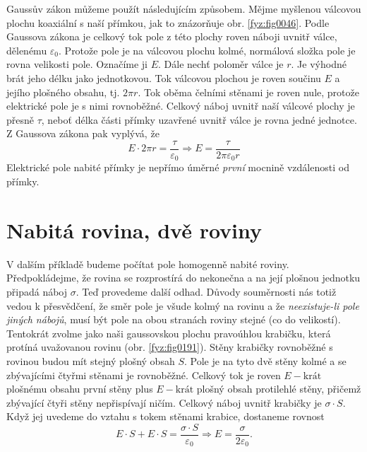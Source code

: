 
  Gaussův zákon můžeme použít následujícím způsobem. Mějme myšlenou válcovou plochu koaxiální s naší
  přímkou, jak to znázorňuje obr. \ref{fyz:fig0046}. Podle Gaussova zákona je celkový tok pole z této
  plochy roven náboji uvnitř válce, dělenému \(\varepsilon_0\). Protože pole je na válcovou plochu
  kolmé, normálová složka pole je rovna velikosti pole. Označíme ji \(E\). Dále nechť poloměr válce
  je \(r\). Je výhodné brát jeho délku jako jednotkovou. Tok válcovou plochou je roven součinu \(E\)
  a jejího plošného obsahu, tj. \(2\pi r\). Tok oběma čelními stěnami je roven nule, protože
  elektrické pole je s nimi rovnoběžné. Celkový náboj uvnitř naší válcové plochy je přesně \(\tau\),
  neboť délka části přímky uzavřené uvnitř válce je rovna jedné jednotce. Z Gaussova zákona pak
  vyplývá, že
  \begin{equation}\label{fyz:eq_fey_elstat_gauss02}
    E\cdot2\pi r = \frac{\tau}{\varepsilon_0} \Rightarrow E = \frac{\tau}{2\pi\varepsilon_0 r}
  \end{equation}
  Elektrické pole nabité přímky je nepřímo úměrné \emph{první} mocnině vzdálenosti od přímky.
  
     

\section{Nabitá rovina, dvě roviny}\label{fyz:IIchapVsecV}
  V dalším příkladě budeme počítat pole homogenně nabité roviny. Předpokládejme, že rovina se
  rozprostírá do nekonečna a na její plošnou jednotku připadá náboj \(\sigma\). Teď provedeme další
  odhad. Důvody souměrnosti nás totiž vedou k přesvědčení, že směr pole je všude kolmý na rovinu a
  že \emph{neexistuje-li pole jiných nábojů}, musí být pole na obou stranách roviny stejné (co do
  velikostí). Tentokrát zvolme jako naši gaussovskou plochu pravoúhlou krabičku, která protíná
  uvažovanou rovinu (obr. \ref{fyz:fig0191}). Stěny krabičky rovnoběžné s rovinou budou mít stejný
  plošný obsah \(S\). Pole je na tyto dvě stěny kolmé a se zbývajícími čtyřmi stěnami je rovnoběžné.
  Celkový tok je roven \(E-\text{krát}\) plošnému obsahu první stěny plus \(E-\text{krát}\) plošný
  obsah protilehlé stěny, přičemž zbývající čtyři stěny nepřispívají ničím. Celkový náboj uvnitř
  krabičky je \(\sigma\cdot S\). Když jej uvedeme do vztahu s tokem stěnami krabice, dostaneme
  rovnost
  \begin{equation}\label{fyz:eq_fey_elstat_gauss03}
    E\cdot S + E\cdot S = \frac{\sigma\cdot S}{\varepsilon_0} \Rightarrow 
    E = \frac{\sigma}{2\varepsilon_0}.
  \end{equation}
  
